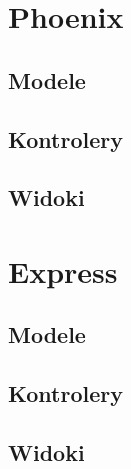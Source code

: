 \section{Phoenix}
\subsection{Modele}

\subsection{Kontrolery}

\subsection{Widoki}


\section{Express}
\subsection{Modele}

\subsection{Kontrolery}

\subsection{Widoki}
